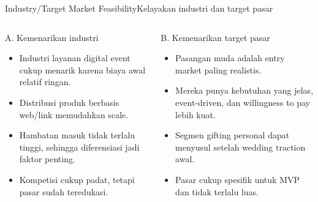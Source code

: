 \documentclass[aspectratio=169,11pt]{beamer}
\begin{document}
\begin{frame}{Industry/Target Market Feasibility}{Kelayakan industri dan target pasar}
\begin{columns}[T,totalwidth=\textwidth]
\begin{block}{A. Kemenarikan industri}
\begin{itemize}
  \item Industri layanan digital event cukup menarik karena biaya awal relatif ringan.
  \item Distribusi produk berbasis web/link memudahkan scale.
  \item Hambatan masuk tidak terlalu tinggi, sehingga diferensiasi jadi faktor penting.
  \item Kompetisi cukup padat, tetapi pasar sudah teredukasi.
\end{itemize}
\end{block}

\begin{block}{B. Kemenarikan target pasar}
\begin{itemize}
  \item Pasangan muda adalah entry market paling realistis.
  \item Mereka punya kebutuhan yang jelas, event-driven, dan willingness to pay lebih kuat.
  \item Segmen gifting personal dapat menyusul setelah wedding traction awal.
  \item Pasar cukup spesifik untuk MVP dan tidak terlalu luas.
\end{itemize}
\end{block}
\end{columns}
\end{frame}
\end{document}
